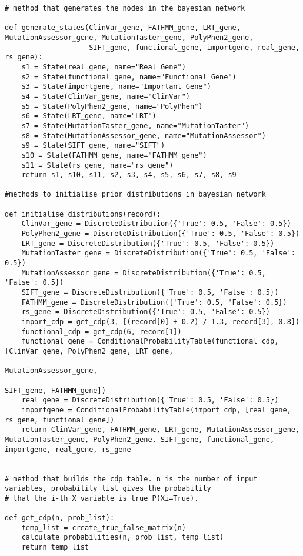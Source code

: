 \documentclass{article}
\begin{document}
\begin{verbatim}
# method that generates the nodes in the bayesian network

def generate_states(ClinVar_gene, FATHMM_gene, LRT_gene, MutationAssessor_gene, MutationTaster_gene, PolyPhen2_gene,
                    SIFT_gene, functional_gene, importgene, real_gene, rs_gene):
    s1 = State(real_gene, name="Real Gene")
    s2 = State(functional_gene, name="Functional Gene")
    s3 = State(importgene, name="Important Gene")
    s4 = State(ClinVar_gene, name="ClinVar")
    s5 = State(PolyPhen2_gene, name="PolyPhen")
    s6 = State(LRT_gene, name="LRT")
    s7 = State(MutationTaster_gene, name="MutationTaster")
    s8 = State(MutationAssessor_gene, name="MutationAssessor")
    s9 = State(SIFT_gene, name="SIFT")
    s10 = State(FATHMM_gene, name="FATHMM_gene")
    s11 = State(rs_gene, name="rs_gene")
    return s1, s10, s11, s2, s3, s4, s5, s6, s7, s8, s9

#methods to initialise prior distributions in bayesian network

def initialise_distributions(record):
    ClinVar_gene = DiscreteDistribution({'True': 0.5, 'False': 0.5})
    PolyPhen2_gene = DiscreteDistribution({'True': 0.5, 'False': 0.5})
    LRT_gene = DiscreteDistribution({'True': 0.5, 'False': 0.5})
    MutationTaster_gene = DiscreteDistribution({'True': 0.5, 'False': 0.5})
    MutationAssessor_gene = DiscreteDistribution({'True': 0.5, 'False': 0.5})
    SIFT_gene = DiscreteDistribution({'True': 0.5, 'False': 0.5})
    FATHMM_gene = DiscreteDistribution({'True': 0.5, 'False': 0.5})
    rs_gene = DiscreteDistribution({'True': 0.5, 'False': 0.5})
    import_cdp = get_cdp(3, [(record[0] + 0.2) / 1.3, record[3], 0.8])
    functional_cdp = get_cdp(6, record[1])
    functional_gene = ConditionalProbabilityTable(functional_cdp, [ClinVar_gene, PolyPhen2_gene, LRT_gene,
                                                                   MutationAssessor_gene,
                                                                   SIFT_gene, FATHMM_gene])
    real_gene = DiscreteDistribution({'True': 0.5, 'False': 0.5})
    importgene = ConditionalProbabilityTable(import_cdp, [real_gene, rs_gene, functional_gene])
    return ClinVar_gene, FATHMM_gene, LRT_gene, MutationAssessor_gene, MutationTaster_gene, PolyPhen2_gene, SIFT_gene, functional_gene, importgene, real_gene, rs_gene


# method that builds the cdp table. n is the number of input variables, probability list gives the probability
# that the i-th X variable is true P(Xi=True).

def get_cdp(n, prob_list):
    temp_list = create_true_false_matrix(n)
    calculate_probabilities(n, prob_list, temp_list)
    return temp_list



\end{verbatim}
\end{document}
